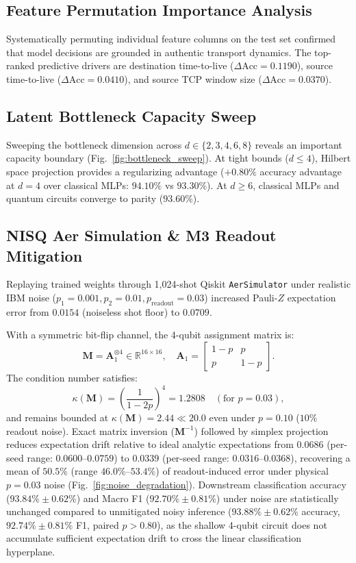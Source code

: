 \documentclass[conference]{IEEEtran}
\begin{document}
\subsection{Feature Permutation Importance Analysis}
Systematically permuting individual feature columns on the test set confirmed that model decisions are grounded in authentic transport dynamics. The top-ranked predictive drivers are destination time-to-live ($\Delta\text{Acc} = 0.1190$), source time-to-live ($\Delta\text{Acc} = 0.0410$), and source TCP window size ($\Delta\text{Acc} = 0.0370$).

\subsection{Latent Bottleneck Capacity Sweep}
Sweeping the bottleneck dimension across $d \in \{2, 3, 4, 6, 8\}$ reveals an important capacity boundary (Fig.~\ref{fig:bottleneck_sweep}). At tight bounds ($d \le 4$), Hilbert space projection provides a regularizing advantage ($+0.80\%$ accuracy advantage at $d=4$ over classical MLPs: $94.10\%$ vs $93.30\%$). At $d \ge 6$, classical MLPs and quantum circuits converge to parity ($93.60\%$).

\subsection{NISQ Aer Simulation \& M3 Readout Mitigation}
Replaying trained weights through 1,024-shot Qiskit \texttt{AerSimulator} under realistic IBM noise ($p_1 = 0.001, p_2 = 0.01, p_{\text{readout}} = 0.03$) increased Pauli-$Z$ expectation error from $0.0154$ (noiseless shot floor) to $0.0709$.

With a symmetric bit-flip channel, the 4-qubit assignment matrix is:
\begin{equation}
\mathbf{M} = \mathbf{A}_1^{\otimes 4} \in \mathbb{R}^{16 \times 16}, \quad \mathbf{A}_1 = \begin{bmatrix} 1 - p & p \\ p & 1 - p \end{bmatrix}.
\end{equation}
The condition number satisfies:
\begin{equation}
\kappa(\mathbf{M}) = \left(\frac{1}{1 - 2p}\right)^4 = 1.2808 \quad (\text{for } p = 0.03),
\end{equation}
and remains bounded at $\kappa(\mathbf{M}) = 2.44 \ll 20.0$ even under $p=0.10$ ($10\%$ readout noise). Exact matrix inversion ($\mathbf{M}^{-1}$) followed by simplex projection reduces expectation drift relative to ideal analytic expectations from $0.0686$ (per-seed range: $0.0600$--$0.0759$) to $0.0339$ (per-seed range: $0.0316$--$0.0368$), recovering a mean of $\mathbf{50.5\%}$ (range $46.0\%$--$53.4\%$) of readout-induced error under physical $p=0.03$ noise (Fig.~\ref{fig:noise_degradation}). Downstream classification accuracy ($93.84\% \pm 0.62\%$) and Macro F1 ($92.70\% \pm 0.81\%$) under noise are statistically unchanged compared to unmitigated noisy inference ($93.88\% \pm 0.62\%$ accuracy, $92.74\% \pm 0.81\%$ F1, paired $p > 0.80$), as the shallow 4-qubit circuit does not accumulate sufficient expectation drift to cross the linear classification hyperplane.
\end{document}
